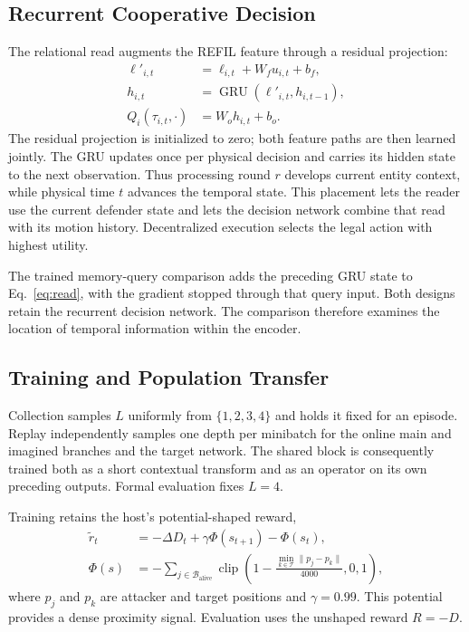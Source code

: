 \subsection{Recurrent Cooperative Decision}
The relational read augments the REFIL feature through a residual projection:
\begin{align}
 \ell'_{i,t}&=\ell_{i,t}+W_f u_{i,t}+b_f,\nonumber\\
 h_{i,t}&=\operatorname{GRU}(\ell'_{i,t},h_{i,t-1}),\nonumber\\
 Q_i(\tau_{i,t},\cdot)&=W_o h_{i,t}+b_o.
 \label{eq:decision}
\end{align}
The residual projection is initialized to zero; both feature paths are then learned jointly. The GRU updates once per physical decision and carries its hidden state to the next observation. Thus processing round $r$ develops current entity context, while physical time $t$ advances the temporal state. This placement lets the reader use the current defender state and lets the decision network combine that read with its motion history. Decentralized execution selects the legal action with highest utility.

The trained memory-query comparison adds the preceding GRU state to Eq.~\eqref{eq:read}, with the gradient stopped through that query input. Both designs retain the recurrent decision network. The comparison therefore examines the location of temporal information within the encoder.

\subsection{Training and Population Transfer}
Collection samples $L$ uniformly from $\{1,2,3,4\}$ and holds it fixed for an episode. Replay independently samples one depth per minibatch for the online main and imagined branches and the target network. The shared block is consequently trained both as a short contextual transform and as an operator on its own preceding outputs. Formal evaluation fixes $L=4$.

Training retains the host's potential-shaped reward,
\begin{align}
 \widetilde r_t&=-\Delta D_t+\gamma\Phi(s_{t+1})-\Phi(s_t),\nonumber\\
 \Phi(s)&=-\sum_{j\in\mathcal B_{\mathrm{alive}}}
 \operatorname{clip}\!\left(1-\frac{\min_{k\in\mathcal T}\|p_j-p_k\|}{4000},0,1\right),
 \label{eq:shaping}
\end{align}
where $p_j$ and $p_k$ are attacker and target positions and $\gamma=0.99$. This potential provides a dense proximity signal. Evaluation uses the unshaped reward $R=-D$.

